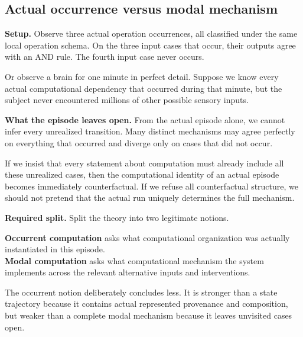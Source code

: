 \documentclass[11pt,a4paper]{article}
\newcounter{thought}
\newenvironment{thoughtbox}[1]{%
  \refstepcounter{thought}%
  \begin{tcolorbox}[
    enhanced,breakable,
    colback=white,colframe=navy,boxrule=0.85pt,
    arc=1.7mm,left=2.8mm,right=2.8mm,top=2.2mm,bottom=2.0mm,
    borderline west={2.2pt}{0pt}{blue},
    title={\large\bfseries Thought experiment \thethought: #1},
    fonttitle=\bfseries,coltitle=navy,
    attach boxed title to top left={xshift=2mm,yshift=-2mm},
    boxed title style={colback=sky,colframe=blue,boxrule=0.55pt,arc=1.2mm},
    before skip=9pt,after skip=10pt
  ]
}{\end{tcolorbox}}
\newcommand{\scene}{\medskip\textbf{Setup.} }
\begin{document}
\subsection{Actual occurrence versus modal mechanism}

\begin{thoughtbox}{One actual run does not identify the whole mechanism}
\scene Observe three actual operation occurrences, all classified under the same local operation schema. On the three input cases that occur, their outputs agree with an AND rule. The fourth input case never occurs.

Or observe a brain for one minute in perfect detail. Suppose we know every actual computational dependency that occurred during that minute, but the subject never encountered millions of other possible sensory inputs.

\medskip\textbf{What the episode leaves open.} From the actual episode alone, we cannot infer every unrealized transition. Many distinct mechanisms may agree perfectly on everything that occurred and diverge only on cases that did not occur.

If we insist that every statement about computation must already include all these unrealized cases, then the computational identity of an actual episode becomes immediately counterfactual. If we refuse all counterfactual structure, we should not pretend that the actual run uniquely determines the full mechanism.

\medskip\textbf{Required split.} Split the theory into two legitimate notions.

\begin{conceptbox}
\textbf{Occurrent computation} asks what computational organization was actually instantiated in this episode.\\[1mm]
\textbf{Modal computation} asks what computational mechanism the system implements across the relevant alternative inputs and interventions.
\end{conceptbox}

The occurrent notion deliberately concludes less. It is stronger than a state trajectory because it contains actual represented provenance and composition, but weaker than a complete modal mechanism because it leaves unvisited cases open.
\end{thoughtbox}
\end{document}
